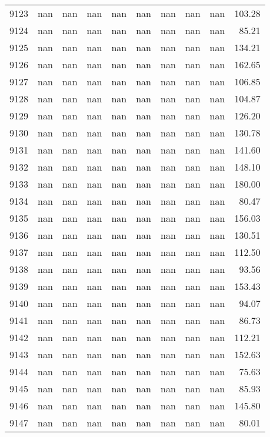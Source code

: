 \begin{tabular}{lrrrrrrrrr}
9123 & nan & nan & nan & nan & nan & nan & nan & nan & 103.28 \\
9124 & nan & nan & nan & nan & nan & nan & nan & nan & 85.21 \\
9125 & nan & nan & nan & nan & nan & nan & nan & nan & 134.21 \\
9126 & nan & nan & nan & nan & nan & nan & nan & nan & 162.65 \\
9127 & nan & nan & nan & nan & nan & nan & nan & nan & 106.85 \\
9128 & nan & nan & nan & nan & nan & nan & nan & nan & 104.87 \\
9129 & nan & nan & nan & nan & nan & nan & nan & nan & 126.20 \\
9130 & nan & nan & nan & nan & nan & nan & nan & nan & 130.78 \\
9131 & nan & nan & nan & nan & nan & nan & nan & nan & 141.60 \\
9132 & nan & nan & nan & nan & nan & nan & nan & nan & 148.10 \\
9133 & nan & nan & nan & nan & nan & nan & nan & nan & 180.00 \\
9134 & nan & nan & nan & nan & nan & nan & nan & nan & 80.47 \\
9135 & nan & nan & nan & nan & nan & nan & nan & nan & 156.03 \\
9136 & nan & nan & nan & nan & nan & nan & nan & nan & 130.51 \\
9137 & nan & nan & nan & nan & nan & nan & nan & nan & 112.50 \\
9138 & nan & nan & nan & nan & nan & nan & nan & nan & 93.56 \\
9139 & nan & nan & nan & nan & nan & nan & nan & nan & 153.43 \\
9140 & nan & nan & nan & nan & nan & nan & nan & nan & 94.07 \\
9141 & nan & nan & nan & nan & nan & nan & nan & nan & 86.73 \\
9142 & nan & nan & nan & nan & nan & nan & nan & nan & 112.21 \\
9143 & nan & nan & nan & nan & nan & nan & nan & nan & 152.63 \\
9144 & nan & nan & nan & nan & nan & nan & nan & nan & 75.63 \\
9145 & nan & nan & nan & nan & nan & nan & nan & nan & 85.93 \\
9146 & nan & nan & nan & nan & nan & nan & nan & nan & 145.80 \\
9147 & nan & nan & nan & nan & nan & nan & nan & nan & 80.01 \\

\end{tabular}
